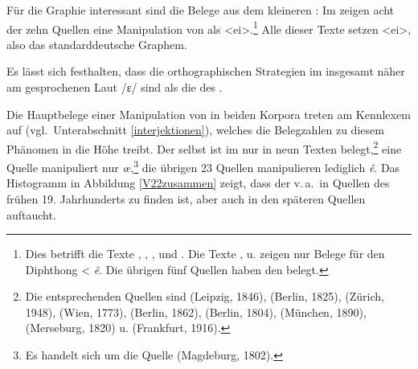 Für die Graphie interessant sind die Belege aus dem kleineren : Im  zeigen acht der zehn Quellen eine Manipulation von  als <ei>.\footnote{Dies betrifft die Texte , , ,  und . Die Texte ,  u.  zeigen nur Belege für den Diphthong < {\mhd}  \textit{ê}. Die  übrigen fünf Quellen haben den  belegt.} Alle dieser Texte setzen <ei>, also das standarddeutsche Graphem. 


Es lässt sich festhalten, dass die orthographischen Strategien im  insgesamt näher am gesprochenen Laut /ɛ\textsubarch{\textsci}/ sind als die des .
 
 Die Hauptbelege einer Manipulation von  in beiden Korpora treten am Kennlexem  auf (vgl.\, Unterabschnitt \ref{interjektionen}), welches die Belegzahlen zu diesem Phänomen in die Höhe treibt. Der  selbst ist im  nur in neun Texten belegt,\footnote{Die entsprechenden Quellen sind  (Leipzig, 1846),  (Berlin, 1825),  (Zürich, 1948),  (Wien, 1773),  (Berlin, 1862),  (Berlin, 1804),  (München, 1890),  (Merseburg, 1820) u.  (Frankfurt, 1916).} eine Quelle manipuliert nur {\mhd} \textit{œ},\footnote{Es handelt sich um die Quelle  (Magdeburg, 1802).} die übrigen 23 Quellen manipulieren lediglich {\mhd} \textit{ê}.  Das Histogramm in Abbildung \ref{V22zusammen} zeigt, dass der  v.\,a.\, in Quellen des frühen 19. Jahrhunderts zu finden ist, aber auch in den späteren Quellen  auftaucht.

